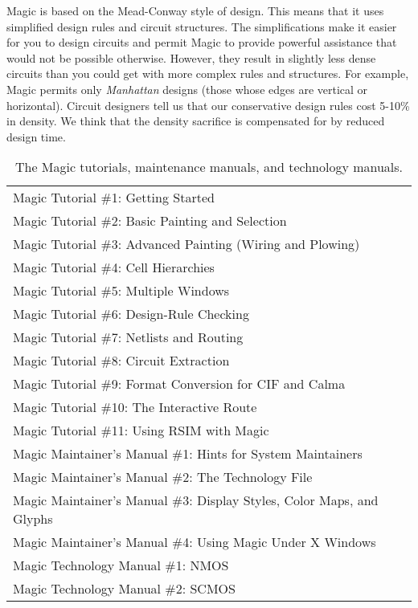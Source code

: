 \documentclass[letterpaper,twoside,12pt]{article}
\begin{document}
Magic is based on the Mead-Conway style of design.  This means
that it uses simplified design rules and circuit structures.
The simplifications make it easier for you to design circuits
and permit Magic to provide powerful assistance that would
not be possible otherwise.  However, they
result in slightly less dense circuits than you could get with
more complex rules and structures.  For example, Magic permits
only {\itshape Manhattan} designs (those whose edges are
vertical or horizontal).  Circuit designers tell us that our
conservative design rules cost 5-10\% in density.  We
think that the density sacrifice is compensated for
by reduced design time.

\begin{table}[ht]
   \begin{center}
      \begin{tabular}{|l|} \hline
	Magic Tutorial \#1: Getting Started \\
	Magic Tutorial \#2: Basic Painting and Selection \\
	Magic Tutorial \#3: Advanced Painting (Wiring and Plowing) \\
	Magic Tutorial \#4: Cell Hierarchies \\
	Magic Tutorial \#5: Multiple Windows \\
	Magic Tutorial \#6: Design-Rule Checking \\
	Magic Tutorial \#7: Netlists and Routing \\
	Magic Tutorial \#8: Circuit Extraction \\
	Magic Tutorial \#9: Format Conversion for CIF and Calma \\
	Magic Tutorial \#10:  The Interactive Route \\
	Magic Tutorial \#11:  Using RSIM with Magic \\ \hline
	Magic Maintainer's Manual \#1: Hints for System Maintainers \\
	Magic Maintainer's Manual \#2: The Technology File \\
	Magic Maintainer's Manual \#3: Display Styles, Color Maps, and Glyphs \\
	Magic Maintainer's Manual \#4: Using Magic Under X Windows \\ \hline
	Magic Technology Manual \#1: NMOS \\
	Magic Technology Manual \#2: SCMOS \\ \hline
      \end{tabular}
   \end{center}
   \caption{The Magic tutorials, maintenance manuals, and technology manuals.}
   \label{tutorials}
\end{table}
\end{document}
